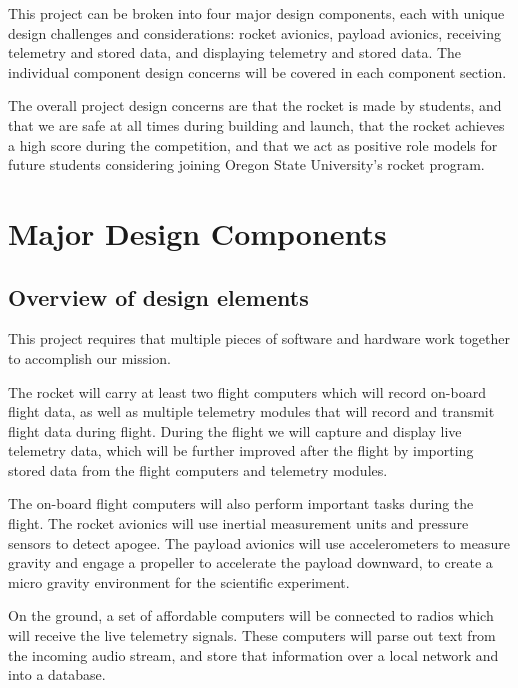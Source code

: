 \documentclass[onecolumn, draftclsnofoot, 10pt, compsoc]{IEEEtran}
\begin{document}
This project can be broken into four major design components, each with unique design challenges and considerations: rocket avionics, payload avionics, receiving telemetry and stored data, and displaying telemetry and stored data.  The individual component design concerns will be covered in each component section.

The overall project design concerns are that the rocket is made by students, and that we are safe at all times during building and launch, that the rocket achieves a high score during the competition, and that we act as positive role models for future students considering joining Oregon State University's rocket program.


\section{Major Design Components}

\subsection{Overview of design elements}

This project requires that multiple pieces of software and hardware work together to accomplish our mission.

The rocket will carry at least two flight computers which will record on-board flight data, as well as multiple telemetry modules that will record and transmit flight data during flight.  During the flight we will capture and display live telemetry data, which will be further improved after the flight by importing stored data from the flight computers and telemetry modules.

The on-board flight computers will also perform important tasks during the flight.  The rocket avionics will use inertial measurement units and pressure sensors to detect apogee.  The payload avionics will use accelerometers to measure gravity and engage a propeller to accelerate the payload downward, to create a micro gravity environment for the scientific experiment.

On the ground, a set of affordable computers will be connected to radios which will receive the live telemetry signals.  These computers will parse out text from the incoming audio stream, and store that information over a local network and into a database.
\end{document}
